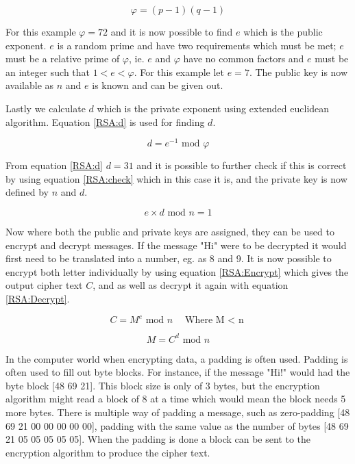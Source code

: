 \begin{equation}
\varphi = (p-1)(q-1)
\label{RSA:phi}
\end{equation}

For this example $\varphi = 72$ and it is now possible to find $e$ which is the public exponent. $e$ is a random prime and have two requirements which must be met; $e$ must be a relative prime of $\varphi$, ie. $e$ and $\varphi$ have no common factors and $e$ must be an integer such that $1 < e < \varphi$. For this example let $e=7$. The public key is now available as $n$ and $e$ is known and can be given out.

Lastly we calculate $d$ which is the private exponent using extended euclidean algorithm. Equation \ref{RSA:d} is used for finding $d$.

\begin{equation}
d = e^{-1} \textrm{ mod } \varphi
\label{RSA:d}
\end{equation}

From equation \ref{RSA:d} $d=31$ and it is possible to further check if this is correct by using equation \ref{RSA:check} which in this case it is, and the private key is now defined by $n$ and $d$.

\begin{equation}
e \times d \textrm{ mod } n = 1
\label{RSA:check}
\end{equation}

Now where both the public and private keys are assigned, they can be used to encrypt and decrypt messages. If the message "Hi" were to be decrypted it would first need to be translated into a number, eg. as 8 and 9. It is now possible to encrypt both letter individually by using equation \ref{RSA:Encrypt} which gives the output cipher text $C$, and as well as decrypt it again with equation \ref{RSA:Decrypt}.

\begin{equation}
C=M^e \textrm{ mod } n \quad \textrm{Where M $<$ n}
\label{RSA:Encrypt}
\end{equation}

\begin{equation}
M=C^d \textrm{ mod } n
\label{RSA:Decrypt}
\end{equation}

In the computer world when encrypting data, a padding is often used. Padding is often used to fill out byte blocks. For instance, if the message "Hi!" would had the byte block [48 69 21]. This block size is only of 3 bytes, but the encryption algorithm might read a block of 8 at a time which would mean the block needs 5 more bytes. There is multiple way of padding a message, such as zero-padding [48 69 21 00 00 00 00 00], padding with the same value as the number of bytes [48 69 21 05 05 05 05 05]\cite{PADDING}. When the padding is done a block can be sent to the encryption algorithm to produce the cipher text.

